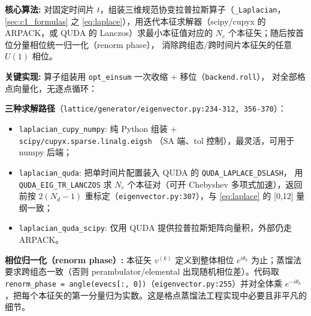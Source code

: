\documentclass[UTF8]{ctexart}
\begin{document}
\begin{algobox}
\textbf{核心算法:} 对固定时间片 $t$，组装三维规范协变拉普拉斯算子（\texttt{\_Laplacian}，
\ref{sec:c1_formulas} 之 \eqref{eq:laplace}），用迭代本征求解器（scipy/cupyx 的 ARPACK，或 QUDA 的
Lanczos）求最小本征值对应的 $N_e$ 个本征矢；随后按首位分量相位统一归一化（renorm phase），
消除跨组态/跨时间片本征矢的任意 $U(1)$ 相位。
\end{algobox}

\textbf{关键实现:} 算子组装用 \texttt{opt\_einsum} 一次收缩 + 移位（\texttt{backend.roll}），
对全部格点向量化，无逐点循环：


\textbf{三种求解路径}（\texttt{lattice/generator/eigenvector.py:234-312, 356-370}）：
\begin{itemize}
\item \texttt{\nolinkurl{laplacian_cupy_numpy}}: 纯 Python 组装 + \texttt{\nolinkurl{scipy/cupyx.sparse.linalg.eigsh}}
  （SA 端、tol 控制），最灵活，可用于 numpy 后端；
\item \texttt{\nolinkurl{laplacian_quda}}: 把单时间片配置装入 QUDA 的 \texttt{\nolinkurl{QUDA_LAPLACE_DSLASH}}，
  用 \texttt{\nolinkurl{QUDA_EIG_TR_LANCZOS}} 求 $N_e$ 个本征对（可开 Chebyshev 多项式加速），返回前按
  $2(N_d-1)$ 重标定（\texttt{eigenvector.py:307}），与 \eqref{eq:laplace} 的 [0,12] 量纲一致；
\item \texttt{\nolinkurl{laplacian_quda_scipy}}: 仅用 QUDA 提供拉普拉斯矩阵向量积，外部仍走 ARPACK。
\end{itemize}

\textbf{相位归一化（renorm phase）:} 本征矢 $v^{(k)}$ 定义到整体相位 $e^{i\theta_k}$ 为止；蒸馏法
要求跨组态一致（否则 perambulator/elemental 出现随机相位差）。代码取
\texttt{renorm\_phase = angle(evecs[:, 0])}（\texttt{eigenvector.py:255}）并对全体乘
$e^{-i\theta_k}$，把每个本征矢的第一分量归为实数。这是格点蒸馏法工程实现中必要且非平凡的细节。
\end{document}
